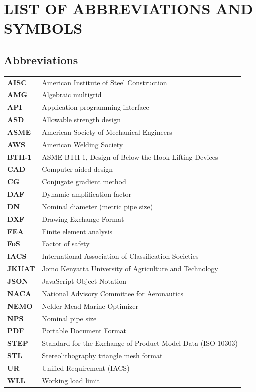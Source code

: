 \documentclass[12pt,a4paper]{report}
\begin{document}
\section*{LIST OF ABBREVIATIONS AND SYMBOLS}

\subsection*{Abbreviations}
\begin{longtable}{p{}p{}}
\textbf{AISC} & American Institute of Steel Construction\\
\textbf{AMG} & Algebraic multigrid\\
\textbf{API} & Application programming interface\\
\textbf{ASD} & Allowable strength design\\
\textbf{ASME} & American Society of Mechanical Engineers\\
\textbf{AWS} & American Welding Society\\
\textbf{BTH-1} & ASME BTH-1, Design of Below-the-Hook Lifting Devices\\
\textbf{CAD} & Computer-aided design\\
\textbf{CG} & Conjugate gradient method\\
\textbf{DAF} & Dynamic amplification factor\\
\textbf{DN} & Nominal diameter (metric pipe size)\\
\textbf{DXF} & Drawing Exchange Format\\
\textbf{FEA} & Finite element analysis\\
\textbf{FoS} & Factor of safety\\
\textbf{IACS} & International Association of Classification Societies\\
\textbf{JKUAT} & Jomo Kenyatta University of Agriculture and Technology\\
\textbf{JSON} & JavaScript Object Notation\\
\textbf{NACA} & National Advisory Committee for Aeronautics\\
\textbf{NEMO} & Nelder-Mead Marine Optimizer\\
\textbf{NPS} & Nominal pipe size\\
\textbf{PDF} & Portable Document Format\\
\textbf{STEP} & Standard for the Exchange of Product Model Data (ISO 10303)\\
\textbf{STL} & Stereolithography triangle mesh format\\
\textbf{UR} & Unified Requirement (IACS)\\
\textbf{WLL} & Working load limit\\
\end{longtable}
\end{document}
